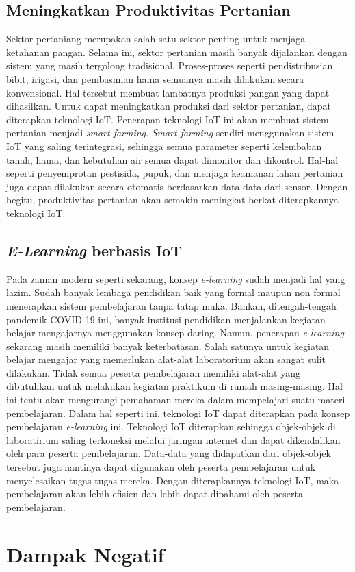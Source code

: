 \documentclass[12pt, letterpaper]{article}
\begin{document}
\subsection{Meningkatkan Produktivitas Pertanian}
Sektor pertaniang merupakan salah satu sektor penting untuk menjaga ketahanan pangan. Selama ini, sektor pertanian masih banyak dijalankan dengan sistem yang masih tergolong tradisional. Proses-proses seperti pendistribusian bibit, irigasi, dan pembasmian hama semuanya masih dilakukan secara konvensional. Hal tersebut membuat lambatnya produksi pangan yang dapat dihasilkan.
\newline
\indent
Untuk dapat meningkatkan produksi dari sektor pertanian, dapat diterapkan teknologi IoT. Penerapan teknologi IoT ini akan membuat sistem pertanian menjadi \textit{smart farming}. \textit{Smart farming} sendiri menggunakan sistem IoT yang saling terintegrasi, sehingga semua parameter seperti kelembaban tanah, hama, dan kebutuhan air semua dapat dimonitor dan dikontrol. Hal-hal seperti penyemprotan pestisida, pupuk, dan menjaga keamanan lahan pertanian juga dapat dilakukan secara otomatis
berdasarkan data-data dari sensor. Dengan begitu, produktivitas pertanian akan semakin meningkat berkat diterapkannya teknologi IoT.\cite{iemcon17} 
\newline
\subsection{\textit{E-Learning} berbasis IoT}
Pada zaman modern seperti sekarang, konsep \textit{e-learning} sudah menjadi hal yang lazim. Sudah banyak lembaga pendidikan baik yang formal maupun non formal menerapkan sistem pembelajaran tanpa tatap muka. Bahkan, ditengah-tengah pandemik COVID-19 ini, banyak institusi pendidikan menjalankan kegiatan belajar mengajarnya menggunakan konsep daring.
\newline
\indent
Namun, penerapan \textit{e-learning} sekarang masih memiliki banyak keterbatasan. Salah satunya untuk kegiatan belajar mengajar yang memerlukan alat-alat laboratorium akan sangat sulit dilakukan. Tidak semua peserta pembelajaran memiliki alat-alat yang dibutuhkan untuk melakukan kegiatan praktikum di rumah masing-masing. Hal ini tentu akan mengurangi pemahaman mereka dalam mempelajari suatu materi pembelajaran.
\newline
\indent
Dalam hal seperti ini, teknologi IoT dapat diterapkan pada konsep pembelajaran \textit{e-learning} ini. Teknologi IoT diterapkan sehingga objek-objek di laboratirium saling terkoneksi melalui jaringan internet dan dapat dikendalikan oleh para peserta pembelajaran. \cite{ijdr17} Data-data yang didapatkan dari objek-objek tersebut juga nantinya dapat digunakan oleh peserta pembelajaran untuk menyelesaikan tugas-tugas mereka. Dengan diterapkannya teknologi IoT, maka pembelajaran akan lebih
efisien dan lebih dapat dipahami oleh peserta pembelajaran.

\newpage
\section{Dampak Negatif}

\newpage
\printbibliography[title=Daftar Pustaka]
\end{document}
